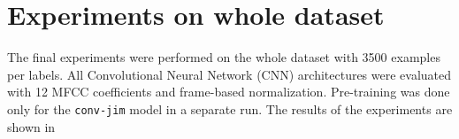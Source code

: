 
\section{Experiments on whole dataset}\label{sec:exp_final}
The final experiments were performed on the whole dataset with 3500 examples per labels.
All Convolutional Neural Network (CNN) architectures were evaluated with 12 MFCC coefficients and frame-based normalization.
Pre-training was done only for the \texttt{conv-jim} model in a separate run.
The results of the experiments are shown in 
 